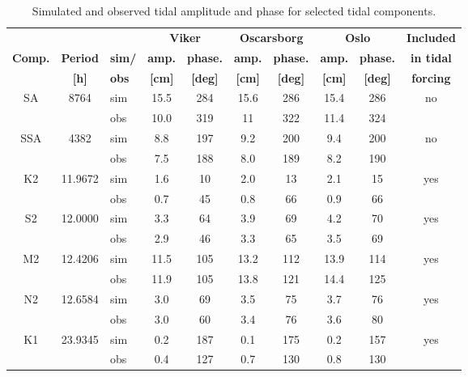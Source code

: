 \begin{table}[t] 
	\caption{\small Simulated and observed tidal amplitude and phase for selected tidal components.} 
	\label{tab:Tide} 
	\centering 
	\begin{tabular}{|c|c|l|cc|cc|cc|c|} 
\hline  
	  &	&	& \multicolumn{2}{|c|}{\small \bf Viker} & \multicolumn{2}{|c|}{\small \bf Oscarsborg} & \multicolumn{2}{|c|}{\small \bf Oslo} & {\small \bf Included} \\  
{\small \bf Comp.} & {\small \bf Period} & {\small \bf sim/} & {\small \bf amp.} & {\small \bf phase.} & {\small \bf amp.} & {\small \bf phase.} & {\small \bf amp.} & {\small \bf phase.} & {\small \bf in tidal} \\ 
	    & {\small \bf [h]} & {\small \bf obs} & {\small \bf [cm]} & {\small \bf [deg]} & {\small \bf [cm]} & {\small \bf [deg]} & {\small \bf [cm]}   & {\small \bf [deg]} & {\small \bf forcing} \\ \hline 
\small SA   & \small 8764	 	& sim & 15.5 & 284 & 15.6 & 286 & 15.4 & 286 & no   \\
\small      &        	& obs & 10.0 & 319 & 11 & 322 & 11.4 & 324 &    \\
\small SSA  & \small 4382 		& sim & 8.8 & 197 & 9.2 & 200 & 9.4 & 200 & no   \\
\small      &        	& obs & 7.5 & 188 & 8.0 & 189 & 8.2 & 190 &    \\
\small K2   & \small 11.9672 	& sim & 1.6 & 10 & 2.0 & 13 & 2.1 & 15 & yes  \\
\small      &        	& obs & 0.7 & 45 & 0.8 & 66 & 0.9 & 66 &    \\
\small S2   & \small 12.0000 	& sim & 3.3 & 64 & 3.9 & 69 & 4.2 & 70 & yes  \\
\small      &        	& obs & 2.9 & 46 & 3.3 & 65 & 3.5 & 69 &    \\
\small M2   & \small 12.4206 	& sim & 11.5 & 105 & 13.2 & 112 & 13.9 & 114 & yes  \\
\small      &        	& obs & 11.9 & 105 & 13.8 & 121 & 14.4 & 125 &    \\
\small N2   & \small 12.6584 	& sim & 3.0 & 69 & 3.5 & 75 & 3.7 & 76 & yes  \\
\small      &        	& obs & 3.0 & 60 & 3.4 & 76 & 3.6 & 80 &    \\
\small K1   & \small 23.9345 	& sim & 0.2 & 187 & 0.1 & 175 & 0.2 & 157 & yes  \\
\small      &        	& obs & 0.4 & 127 & 0.7 & 130 & 0.8 & 130 &    \\

\end{tabular}
\end{table}
